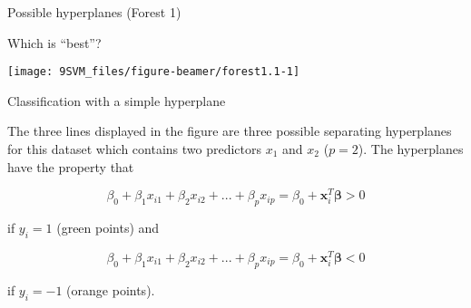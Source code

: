 \documentclass[10pt,ignorenonframetext,]{beamer}
\begin{document}
\begin{frame}

\begin{block}{Possible hyperplanes (Forest 1)}

\vspace{2mm} Which is ``best''?

\begin{center}\texttt{[image: 9SVM\_files/figure-beamer/forest1.1-1]} \end{center}

\end{block}

\end{frame}

\begin{frame}

\begin{block}{Classification with a simple hyperplane}

\vspace{2mm}

The three lines displayed in the figure are three possible separating
hyperplanes for this dataset which contains two predictors \(x_1\) and
\(x_2\) (\(p=2\)). The hyperplanes have the property that

\[\beta_0+\beta_1 x_{i1} + \beta_2 x_{i2}+...+\beta_p x_{ip}=\beta_0+{\boldsymbol x}_i^T {\boldsymbol \beta}>0\]

if \(y_i=1\) (green points) and

\[\beta_0+\beta_1 x_{i1} + \beta_2 x_{i2}+...+\beta_p x_{ip}=\beta_0+{\boldsymbol x}_i^T {\boldsymbol \beta}<0\]

if \(y_i=-1\) (orange points).

\end{block}

\end{frame}
\end{document}
